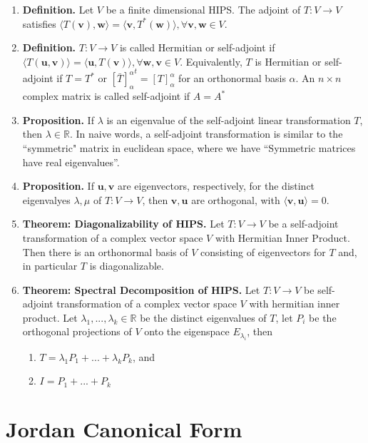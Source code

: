 \documentclass[oneside, 12pt]{book}
\newcommand{\settag}[1]{\renewcommand{\theenumi}{#1}}
\newcommand{\real}{\mathbb{R}}
\newcommand{\tbf}[1]{\textbf{#1}}
\newcommand{\trans}[3]{$#1:#2\rightarrow{}#3$}
\newcommand{\map}[3]{\text{$\left[#1\right]_{#2}^{#3}$}}
\newcommand{\para}[1]{\item \tbf{#1}}
\newcommand{\vv}{\mathbf{v}}
\newcommand{\vu}{\mathbf{u}}
\newcommand{\vw}{\mathbf{w}}
\begin{document}
\begin{enumerate}
    \settag{5.3.8}
    \para{Definition.} Let $V$ be a finite dimensional HIPS. The adjoint of \trans{T}{V}{V} satisfies 
    $\langle T(\vv), \vw\rangle = \langle \vv,T^*(\vw)\rangle, \forall \vv,\vw\in V$.

    \settag{5.3.9}
    \para{Definition.} \trans{T}{V}{V} is called Hermitian or self-adjoint if $\langle T(\vu, \vv)\rangle =\langle \vu,T(\vv)\rangle,\forall \vw,\vv\in V$.
    Equivalently, $T$ is Hermitian or self-adjoint if $T = T^*$ or $\map{\bar{T}}{\alpha}{\alpha}^t = \map{T}{\alpha}{\alpha}$ for an orthonormal basis $\alpha$.
     An $n\times n$ complex matrix is called self-adjoint if $A = A^*$

    \settag{5.3.10}
    \para{Proposition.} If $\lambda$ is an eigenvalue of the self-adjoint linear transformation $T$, then $\lambda \in \real$. 
    In naive words, a self-adjoint transformation is similar to the ``symmetric" matrix in euclidean space, 
    where we have ``Symmetric matrices have real eigenvalues''.

    \settag{5.3.11}
    \para{Proposition.} If $\vu, \vv$ are eigenvectors, respectively, for the distinct eigenvalyes $\lambda, \mu$ 
    of \trans{T}{V}{V}, then $\vv, \vu$ are orthogonal, with $\langle \vv, \vu\rangle = 0$.

    \settag{5.3.12}
    \para{Theorem: Diagonalizability of HIPS.} Let \trans{T}{V}{V} be a self-adjoint transformation of a 
    complex vector space $V$ with Hermitian Inner Product. Then there is an orthonormal basis of $V$ 
    consisting of eigenvectors for $T$ and, in particular $T$ is diagonalizable.

    \settag{5.3.13}
    \para{Theorem: Spectral Decomposition of HIPS.} Let \trans{T}{V}{V} be self-adjoint transformation of a complex vector space 
    $V$ with hermitian inner product. Let $\lambda_1,...,\lambda_k\in \real$ be the distinct eigenvalues of 
    $T$, let $P_i$ be the orthogonal projections of $V$ onto the eigenspace $E_{\lambda_i}$, then
    \begin{enumerate}
        \item $T = \lambda_1P_1 + ... + \lambda_kP_k$, and
        \item $I = P_1 + ... + P_k$
    \end{enumerate}

\end{enumerate}

\chapter{Jordan Canonical Form}
\end{document}
